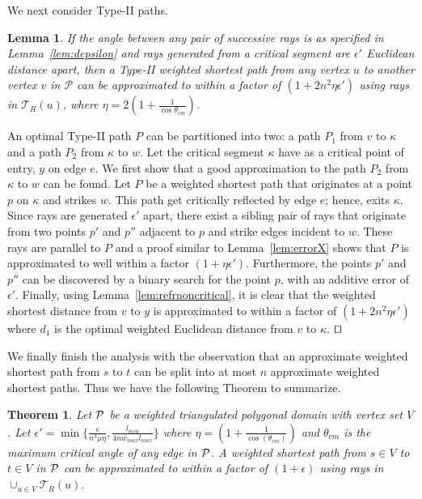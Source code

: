 \documentclass[11pt]{article}
\def\qed{\hbox{\rlap{$\sqcap$}$\sqcup$}}
\def\calP{\mathcal{P}}
\def\calT{\mathcal{T}}
\newtheorem{theorem}{Theorem}[section]
\newtheorem{lemma}{Lemma}[section]
\newenvironment{proof}{\par\noindent{\bf Proof:}}{\mbox{}\hfill$\qed$\\}
\begin{document}
We next consider Type-II paths.
\begin{lemma}
\label{lem:refrcritical}
If the angle between any pair of successive rays is as specified in Lemma~\ref{lem:depsilon} and rays generated from a critical segment are $\epsilon'$ Euclidean distance apart, then a Type-II weighted shortest path from any vertex $u$ to another vertex $v$ in $\calP$ can be approximated to within a factor of $(1+ 2n^2 \eta \epsilon')$ using rays in $\calT_R(u)$, where $\eta= 2(1+ \frac{1}{\cos{\theta_{cm}}})$.
\end{lemma}
\begin{proof}
An optimal Type-II path $P$ can be partitioned into two: a path $P_1$ from $v$ to $\kappa$ and a path $P_2$ from $\kappa$ to $w$.
Let the critical segment $\kappa$ have as a critical point of entry, $y$ on edge $e$.
We first show that a good approximation to the path $P_2$ from $\kappa$ to $w$ can be found.
Let $P$ be a weighted shortest path that originates at a point $p$ on $\kappa$ and strikes $w$.
This path get critically reflected by edge $e$; hence, exits $\kappa$.
Since rays are generated $\epsilon'$ apart, there exist a sibling pair of rays that originate from two
points $p'$ and $p''$ adjacent to $p$ and strike edges incident to $w$.
These rays are parallel to $P$ and a proof similar to Lemma~\ref{lem:errorX} shows that 
$P$ is approximated to well within a factor $(1+\eta \epsilon')$.
Furthermore, the points $p'$ and $p''$ can be discovered by a binary search for the point $p$, with an additive error of $\epsilon'$.
Finally, using Lemma~\ref{lem:refrnoncritical}, it is clear that the weighted shortest distance from $v$ to $y$ is approximated to within a factor of $(1+2n^2\eta \epsilon')$ where $d_1$ is the optimal weighted Euclidean distance from $v$ to $\kappa$. 
\end{proof}

We finally finish the analysis with the observation that an approximate weighted shortest path from $s$ to $t$ can be split into at most $n$ approximate weighted shortest paths.
Thus we have the following Theorem to summarize.
\begin{theorem}
Let ${\cal P}$ be a weighted triangulated polygonal domain with vertex set $V $. Let $\epsilon' = \min \{ \frac{\epsilon}{n^3\mu\eta},
\frac{l_{min}}{4n w_{max} l_{max}} \}$
where $\eta= (1+ \frac{1}{\cos ( \theta_{cm})})$
and $\theta_{cm}$ is the maximum critical angle of any edge in $\cal{P}$.
A weighted shortest path from $s \in V$ to $t \in V $ in ${\cal P}$ can be approximated to within a factor of $(1+\epsilon)$ using rays in $\cup_{u  \in V} \calT_R(u)$.
\end{theorem}
\end{document}
